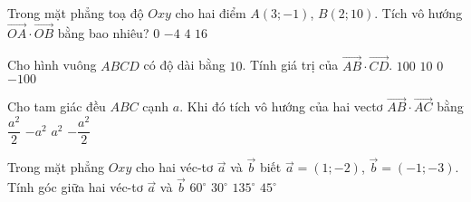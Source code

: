 \begin{ex}%
	Trong mặt phẳng toạ độ $Oxy$ cho hai điểm $A(3;-1)$, $B(2;10)$. Tích vô hướng $\overrightarrow{OA}\cdot\overrightarrow{OB}$ bằng bao nhiêu?
	\choice
	{$0$}
	{\True $-4$}
	{$4$}
	{$16$}
\end{ex}

\begin{ex}%
	Cho hình vuông $ABCD$ có độ dài bằng $10$. Tính giá trị của $\overrightarrow{AB}\cdot \overrightarrow{CD}$.
	\choice
	{$100 $}
	{$10 $}
	{$0 $}
	{\True $-100 $}
\end{ex}

\begin{ex}%
Cho tam giác đều $ABC$ cạnh $a$. Khi đó tích vô hướng của hai vectơ $\overrightarrow{AB}\cdot\overrightarrow{AC}$ bằng
\choice
{\True $\dfrac{a^2}{2}$}
{$-a^2$}
{$a^2$}
{$-\dfrac{a^2}{2}$}
\end{ex}

\begin{ex}%
	Trong mặt phẳng $Oxy$ cho hai véc-tơ $\overrightarrow{a}$ và $\overrightarrow{b}$ biết $\overrightarrow{a}=(1;-2)$, $\overrightarrow{b}=(-1;-3)$. Tính góc giữa hai véc-tơ $\overrightarrow{a}$ và $\overrightarrow{b}$
	\choice
	{$60^\circ$}
	{$30^\circ$}
	{$135^\circ$}
	{\True $45^\circ$}
\end{ex}

